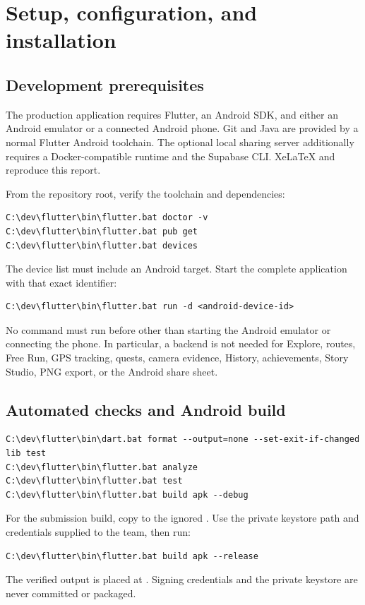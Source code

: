 \section{Setup, configuration, and installation}

\subsection{Development prerequisites}
The production application requires Flutter, an Android SDK, and either an
Android emulator or a connected Android phone. Git and Java are provided by a
normal Flutter Android toolchain. The optional local sharing server additionally
requires a Docker-compatible runtime and the Supabase CLI. XeLaTeX and
 reproduce this report.

From the repository root, verify the toolchain and dependencies:
\begin{verbatim}
C:\dev\flutter\bin\flutter.bat doctor -v
C:\dev\flutter\bin\flutter.bat pub get
C:\dev\flutter\bin\flutter.bat devices
\end{verbatim}

The device list must include an Android target. Start the complete application
with that exact identifier:
\begin{verbatim}
C:\dev\flutter\bin\flutter.bat run -d <android-device-id>
\end{verbatim}

No command must run before  other than starting the Android
emulator or connecting the phone. In particular, a backend is not needed for
Explore, routes, Free Run, GPS tracking, quests, camera evidence, History,
achievements, Story Studio, PNG export, or the Android share sheet.

\subsection{Automated checks and Android build}
\begin{verbatim}
C:\dev\flutter\bin\dart.bat format --output=none --set-exit-if-changed lib test
C:\dev\flutter\bin\flutter.bat analyze
C:\dev\flutter\bin\flutter.bat test
C:\dev\flutter\bin\flutter.bat build apk --debug
\end{verbatim}

For the submission build, copy  to the
ignored . Use the private keystore path and
credentials supplied to the team, then run:
\begin{verbatim}
C:\dev\flutter\bin\flutter.bat build apk --release
\end{verbatim}
The verified output is placed at . Signing credentials
and the private keystore are never committed or packaged.

